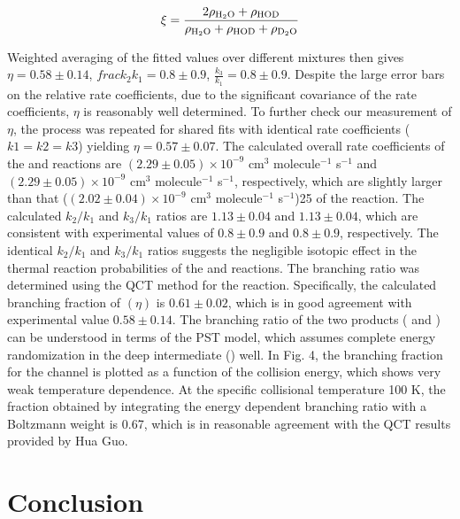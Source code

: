\begin{equation}
	\xi = \frac{2 \rho_{\ce{H2O}} + \rho_{\ce{HOD}}}{\rho_{\ce{H2O}} + \rho_{\ce{HOD}} + \rho_{\ce{D2O}}}
\end{equation}

Weighted averaging of the fitted values over different mixtures then gives $\eta = 0.58 \pm 0.14$, $frac{k_2}{k_1} = 0.8 \pm 0.9$, $\frac{k_3}{k_1} = 0.8 \pm 0.9$. Despite the large error bars on the relative rate coefficients, due to the significant covariance of the rate coefficients, $\eta$ is reasonably well determined. To further check our measurement of $\eta$, the process was repeated for shared fits with identical rate coefficients ($k1 = k2 = k3$) yielding $\eta = 0.57 \pm 0.07$. The calculated overall rate coefficients of the  and  reactions are $(2.29 \pm 0.05) \times 10^{-9}$ cm$^3$ molecule$^{-1}$ s$^{-1}$ and $(2.29 \pm 0.05) \times 10^{-9}$ cm$^3$ molecule$^{-1}$ s$^{-1}$, respectively, which are slightly larger than that ($(2.02 \pm 0.04) \times 10^{-9}$ cm$^3$ molecule$^{-1}$ s$^{-1}$)25 of the  reaction. The calculated $k_2/k_1$ and $k_3/k_1$ ratios are $1.13 \pm 0.04$ and $1.13 \pm 0.04$, which are consistent with experimental values of $0.8 \pm 0.9$ and $0.8 \pm 0.9$, respectively. The identical $k_2/k_1$ and $k_3/k_1$ ratios suggests the negligible isotopic effect in the thermal reaction probabilities of the  and  reactions. The branching ratio was determined using the QCT method for the  reaction. Specifically, the calculated branching fraction of  $(\eta)$ is $0.61 \pm 0.02$, which is in good agreement with experimental value $0.58 \pm 0.14$. The branching ratio of the two products ( and ) can be understood in terms of the PST model, which assumes complete energy randomization in the deep intermediate () well. In Fig. 4, the branching fraction for the  channel is plotted as a function of the collision energy, which shows very weak temperature dependence. At the specific collisional temperature 100 K, the fraction obtained by integrating the energy dependent branching ratio with a Boltzmann weight is 0.67, which is in reasonable agreement with the QCT results provided by Hua Guo.\cite{Chen2018}

\section{Conclusion}

